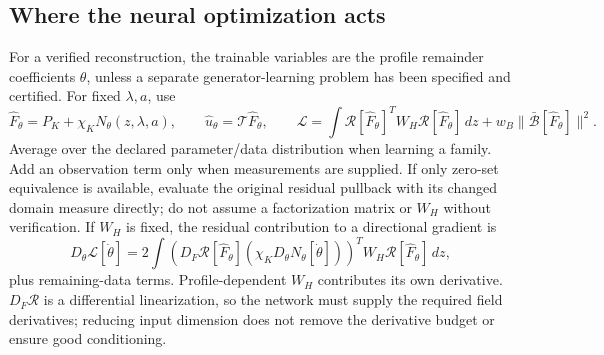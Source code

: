 \documentclass[11pt]{article}
\theoremstyle{definition}
\begin{document}
\subsection{Where the neural optimization acts}
\label{sec:optimization-core}
For a verified reconstruction, the trainable variables are the profile
remainder coefficients $\theta$, unless a separate generator-learning
problem has been specified and certified. For fixed $\lambda,a$, use
\begin{equation}
 \widehat F_\theta=P_K+\chi_KN_\theta(z,\lambda,a),\qquad
 \widehat u_\theta=\mathcal T\widehat F_\theta,\qquad
 \mathcal L=\int\mathcal R[\widehat F_\theta]^T
                    W_H\mathcal R[\widehat F_\theta]\,dz
             +w_B\|\bar{\mathcal B}[\widehat F_\theta]\|^2.
 \label{eq:neural}
\end{equation}
Average over the declared parameter/data distribution when learning a
family. Add an observation term only when measurements are supplied.
If only zero-set equivalence is available, evaluate the original residual
pullback with its changed domain measure directly; do not assume a
factorization matrix or $W_H$ without verification.
If $W_H$ is fixed, the residual contribution to a directional gradient is
\begin{equation}
 D_\theta\mathcal L[\dot\theta]
  =2\int (D_F\mathcal R[\widehat F_\theta]
                    (\chi_KD_\theta N_\theta[\dot\theta]))^T
                      W_H\mathcal R[\widehat F_\theta]\,dz,
 \label{eq:optimization-gradient-core}
\end{equation}
plus remaining-data terms. Profile-dependent $W_H$ contributes its own
derivative. $D_F\mathcal R$ is a differential linearization, so the network
must supply the required field derivatives; reducing input dimension does
not remove the derivative budget or ensure good conditioning.
\end{document}
